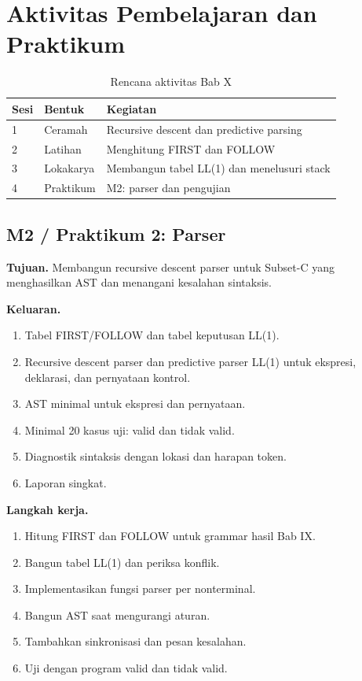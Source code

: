 \section*{Aktivitas Pembelajaran dan Praktikum}

\begin{table}[H]
\centering
\caption{Rencana aktivitas Bab X}
\label{tab:ch10-aktivitas}
\begin{tabularx}{\textwidth}{@{}llX@{}}
\toprule
\textbf{Sesi} & \textbf{Bentuk} & \textbf{Kegiatan} \\
\midrule
1 & Ceramah & Recursive descent dan predictive parsing \\
2 & Latihan & Menghitung FIRST dan FOLLOW \\
3 & Lokakarya & Membangun tabel LL(1) dan menelusuri stack \\
4 & Praktikum & M2: parser dan pengujian \\
\bottomrule
\end{tabularx}
\end{table}

\subsection*{M2 / Praktikum 2: Parser}
\textbf{Tujuan.} Membangun recursive descent parser untuk Subset-C
yang menghasilkan AST dan menangani kesalahan sintaksis.

\textbf{Keluaran.}
\begin{enumerate}[label=\arabic*.,leftmargin=*]
  \item Tabel FIRST/FOLLOW dan tabel keputusan LL(1).
  \item Recursive descent parser dan predictive parser LL(1) untuk
        ekspresi, deklarasi, dan pernyataan kontrol.
  \item AST minimal untuk ekspresi dan pernyataan.
  \item Minimal 20 kasus uji: valid dan tidak valid.
  \item Diagnostik sintaksis dengan lokasi dan harapan token.
  \item Laporan singkat.
\end{enumerate}

\textbf{Langkah kerja.}
\begin{enumerate}[label=\arabic*.,leftmargin=*]
  \item Hitung FIRST dan FOLLOW untuk grammar hasil Bab IX.
  \item Bangun tabel LL(1) dan periksa konflik.
  \item Implementasikan fungsi parser per nonterminal.
  \item Bangun AST saat mengurangi aturan.
  \item Tambahkan sinkronisasi dan pesan kesalahan.
  \item Uji dengan program valid dan tidak valid.
\end{enumerate}

